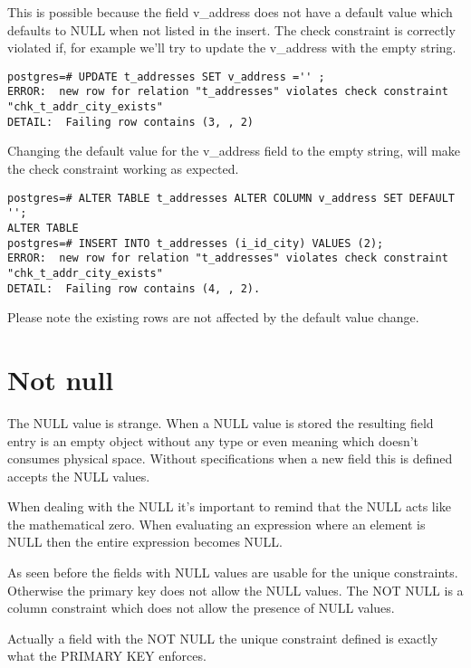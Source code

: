 This is possible because the field v\_address does not have a default value which defaults to NULL when
not listed in the insert. The check constraint is correctly violated if, for example we'll try to update
the v\_address with the empty string.

\begin{lstlisting}[style=pgsql]
postgres=# UPDATE t_addresses SET v_address ='' ;
ERROR:  new row for relation "t_addresses" violates check constraint "chk_t_addr_city_exists"
DETAIL:  Failing row contains (3, , 2)
\end{lstlisting}

Changing the default value for the v\_address field to the empty string, will make the check constraint
working as expected.

\begin{lstlisting}[style=pgsql]
postgres=# ALTER TABLE t_addresses ALTER COLUMN v_address SET DEFAULT '';
ALTER TABLE
postgres=# INSERT INTO t_addresses (i_id_city) VALUES (2);
ERROR:  new row for relation "t_addresses" violates check constraint "chk_t_addr_city_exists"
DETAIL:  Failing row contains (4, , 2).

\end{lstlisting}
Please note the existing rows are not affected by the default value change.


\section{Not null}
The NULL value is strange. When a NULL value is stored the resulting field entry is an empty object
without any type or even meaning which doesn't consumes physical space. Without specifications when a
new field this is defined accepts the NULL values.\newline

When dealing with the NULL it's important to remind that the NULL acts like the mathematical 
zero. When evaluating an expression where an element is NULL then the entire expression becomes
NULL.\newline

As seen before the fields with NULL values are usable for the unique constraints. Otherwise the primary
key does not allow the NULL values. The NOT NULL is a column constraint which does not allow the presence
of NULL values.\newline

Actually a field with the NOT NULL the unique constraint defined is exactly what the PRIMARY KEY
enforces.\newline

